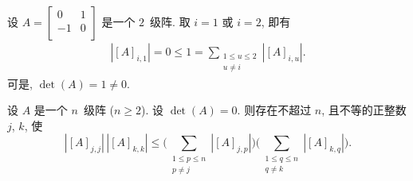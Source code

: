 \begin{example}
    设 \(A =
    \begin{bmatrix}
        0  & 1 \\
        -1 & 0 \\
    \end{bmatrix}\)
    是一个 \(2\)~级阵.
    取 \(i = 1\) 或 \(i = 2\), 即有
    \begin{align*}
        |[A]_{i,1}|
        = 0
        \leq 1
        = \sum_{\substack{1 \leq u \leq 2 \\u \neq i}} {|[A]_{i,u}|}.
    \end{align*}
    可是, \(\det {(A)} = 1 \neq 0\).
\end{example}

\begin{theorem}
    设 \(A\) 是一个 \(n\)~级阵 (\(n \geq 2\)).
    设 \(\det {(A)} = 0\).
    则存在不超过 \(n\), 且不等的正整数 \(j\), \(k\), 使
    \begin{equation}
        |[A]_{j,j}|\,|[A]_{k,k}| \leq
        \Bigg(
        \sum_{\substack{1 \leq p \leq n \\
                p \neq j}} {|[A]_{j,p}|}
        \Bigg)
        \Bigg(
        \sum_{\substack{1 \leq q \leq n \\
                q \neq k}} {|[A]_{k,q}|}
        \Bigg).
        \label{eq:NonzeroDet2}
    \end{equation}
\end{theorem}

